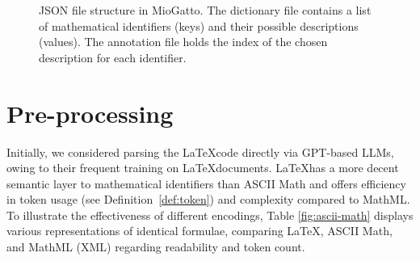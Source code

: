\begin{figure}[htpb]
  \centering
  \quad 
  \caption[LaTeXML Preprocessing]{JSON file structure in MioGatto. The dictionary file contains a list of mathematical identifiers (keys) and their possible descriptions (values). The annotation file holds the index of the chosen description for each identifier.}\label{fig:miogatto-data}
\end{figure}

\section{Pre-processing}\label{sec:pre-processing}

Initially, we considered parsing the \LaTeX \space code directly via GPT-based LLMs, owing to their frequent training on \LaTeX \space documents. \LaTeX \space has a more decent semantic layer to mathematical identifiers than ASCII Math and offers efficiency in token usage (see Definition~\ref{def:token}) and complexity compared to MathML. To illustrate the effectiveness of different encodings, Table \ref{fig:ascii-math} displays various representations of identical formulae, comparing \LaTeX, ASCII Math, and MathML (XML) regarding readability and token count.


